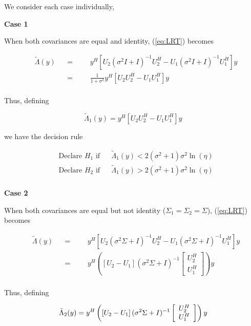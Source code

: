 \documentclass[english]{article}
\begin{document}
We consider each case individually,

{\bf{Case 1}}

When both covariances are equal and identity, (\ref{eq:LRT}) becomes

\begin{equation}
\begin{aligned}
&\tilde{\Lambda}(y)
&&=
&&&y^H\left[U_2(\sigma^2I+I)^{-1}U_2^H-U_1(\sigma^2I+I)^{-1}U_1^H\right]y\\
&&&=
&&&\frac{1}{1+\sigma^2}y^H\left[U_2U_2^H-U_1U_1^H\right]y\\
\end{aligned}
\end{equation}

Thus, defining

\begin{equation}
\tilde{\Lambda}_1(y)=y^H\left[U_2U_2^H-U_1U_1^H\right]y
\end{equation}

we have the decision rule

\begin{equation}
\begin{aligned}
&\text{Declare } H_1 \text{ if}
&& \tilde{\Lambda}_1(y) < 2(\sigma^2+1)\sigma^2\ln(\eta)\\
& \text{Declare } H_2 \text{ if}
&& \tilde{\Lambda}_1(y) > 2(\sigma^2+1)\sigma^2\ln(\eta)\\
\end{aligned}
\end{equation}

{\bf{Case 2}}

When both covariances are equal but not identity ($\Sigma_1=\Sigma_2=\Sigma$), (\ref{eq:LRT}) becomes

\begin{equation}
\begin{aligned}
&\tilde{\Lambda}(y)
&&=
&&&y^H\left[U_2(\sigma^2\Sigma+I)^{-1}U_2^H-U_1(\sigma^2\Sigma+I)^{-1}U_1^H\right]y\\
&&&=
&&&y^H\left(\left[U_2 -U_1\right](\sigma^2\Sigma+I)^{-1}\left[\begin{array}{c} U_2^H \\ U_1^H \end{array}\right]\right)y\\
\end{aligned}
\end{equation}

Thus, defining

\begin{equation}
\tilde{\Lambda}_2(y)=y^H\left(\left[U_2 -U_1\right](\sigma^2\Sigma+I)^{-1}\left[\begin{array}{c} U_2^H \\ U_1^H \end{array}\right]\right)y\\
\end{equation}
\end{document}
